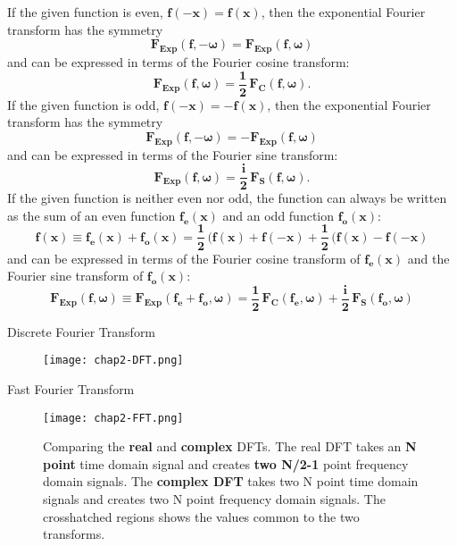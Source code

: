 \begin{compactitem}
\noindent If the given function is even, $\mathbf{f(-x) = f(x) }$, then the
exponential Fourier transform has the symmetry
\begin{equation}
\mathbf{F_{Exp}(f,\boldsymbol{-\omega}) = F_{Exp}(f,\boldsymbol{\omega}) }
\end{equation}
and can be expressed in terms of the Fourier cosine transform:
\begin{equation}
\mathbf{F_{Exp}(f,\boldsymbol{\omega}) = \frac{1}{2} \, F_{C}(f,\boldsymbol{\omega})}.
\end{equation}
If the given function is odd, $\mathbf{f(-x) = -f(x) }$, then the
exponential Fourier transform has the symmetry
\begin{equation}
\mathbf{F_{Exp}(f,\boldsymbol{-\omega}) = -F_{Exp}(f,\boldsymbol{\omega}) }
\end{equation}
and can be expressed in terms of the Fourier sine transform:
\begin{equation}
\mathbf{F_{Exp}(f,\boldsymbol{\omega}) = \frac{i}{2} \, F_{S}(f,\boldsymbol{\omega})}.
\end{equation}
If the given function is neither even nor odd, the function can always be written
  as the sum of an even function $\mathbf{f_{e}(x)}$ and an odd function $\mathbf{f_{o}(x)}$:
\begin{equation}
\mathbf{f(x) \equiv f_{e}(x) + f_{o}(x) =
  \frac{1}{2} \,( f(x) + f(-x) + \frac{1}{2} \, ( f(x) - f(-x) }
\end{equation}
and can be expressed in terms of the Fourier cosine transform of $\mathbf{f_{e}(x)}$
  and the Fourier sine transform of $\mathbf{f_{o}(x)}$:
\begin{equation}
\mathbf{F_{Exp}(f,\boldsymbol{\omega}) \equiv F_{Exp}(f_{e}+f_{o},\boldsymbol{\omega}) =
  \frac{1}{2} \, F_{C}(f_{e},\boldsymbol{\omega}) +
  \frac{i}{2} \, F_{S}(f_{o},\boldsymbol{\omega}) }
\end{equation}


\item {Discrete Fourier Transform}

\begin{figure}[ht]
  \centering
	\texttt{[image: chap2-DFT.png]}
	\caption{}
  \label{fig:chap2-DFT}
\end{figure}\cite{smith1997scientist}

\item {Fast Fourier Transform}
\begin{figure}
  \centering
	\texttt{[image: chap2-FFT.png]}
	\caption{Comparing the \textbf{real} and \textbf{complex} DFTs.
The real DFT takes an \textbf{N point} time domain signal and creates \textbf{two N/2-1} point frequency domain signals.
The \textbf{complex DFT} takes two N point time domain signals and creates two N point frequency domain signals.
The crosshatched regions shows the values common to the two transforms.}
  \label{fig:chap2-FFT}
\end{figure}


\end{compactitem}
